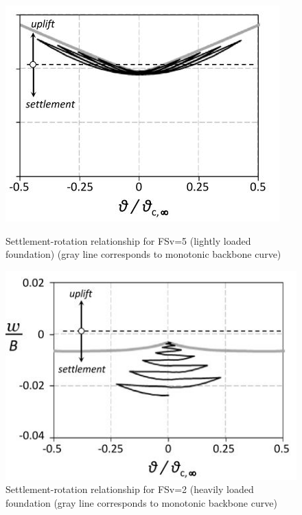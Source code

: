 \documentclass[11pt,a4paper]{report}
\begin{document}
\begin{figure}[!h]
	\centering
	\begin{minipage}[b]{0.4\textwidth}
		\includegraphics[width=\textwidth]{settle}
		\caption{Settlement-rotation relationship for FSv=5 (lightly loaded foundation) (gray line corresponds to monotonic backbone curve)}
		\label{set}
	\end{minipage}
	\hfill
	\begin{minipage}[b]{0.45\textwidth}
		\includegraphics[width=\textwidth]{settle2}
		\caption{Settlement-rotation relationship for FSv=2 (heavily loaded foundation (gray line corresponds to monotonic backbone curve)}
		\label{set2}
	\end{minipage}
\end{figure} 
\end{document}
